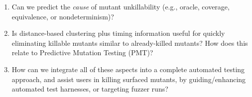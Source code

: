 \begin{enumerate}[labelsep=3pt,leftmargin=12pt]
  (predicted) FPF?
\item Can we predict the \emph{cause} of mutant
  unkillability (e.g., oracle, coverage, equivalence, or nondeterminism)?
\item Is distance-based clustering plus timing information useful for quickly
  eliminating killable mutants similar to already-killed mutants?  How
  does this relate to Predictive Mutation Testing (PMT)?
  \item How can we integrate all of these aspects into a complete
    automated testing approach, and assist users in killing surfaced
    mutants, by guiding/enhancing automated test harnesses, or
    targeting fuzzer runs?

\end{enumerate}


